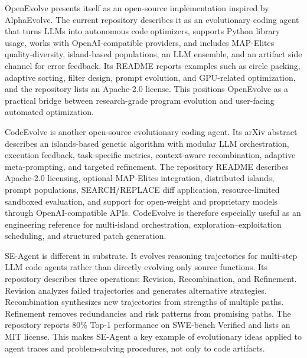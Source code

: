 OpenEvolve presents itself as an open-source implementation inspired by AlphaEvolve.  The current repository describes it as an evolutionary coding agent that turns LLMs into autonomous code optimizers, supports Python library usage, works with OpenAI-compatible providers, and includes MAP-Elites quality-diversity, island-based populations, an LLM ensemble, and an artifact side channel for error feedback.  Its README reports examples such as circle packing, adaptive sorting, filter design, prompt evolution, and GPU-related optimization, and the repository lists an Apache-2.0 license.  This positions OpenEvolve as a practical bridge between research-grade program evolution and user-facing automated optimization.

CodeEvolve is another open-source evolutionary coding agent.  Its arXiv abstract describes an islands-based genetic algorithm with modular LLM orchestration, execution feedback, task-specific metrics, context-aware recombination, adaptive meta-prompting, and targeted refinement.  The repository README describes Apache-2.0 licensing, optional MAP-Elites integration, distributed islands, prompt populations, SEARCH/REPLACE diff application, resource-limited sandboxed evaluation, and support for open-weight and proprietary models through OpenAI-compatible APIs.  CodeEvolve is therefore especially useful as an engineering reference for multi-island orchestration, exploration--exploitation scheduling, and structured patch generation.

SE-Agent is different in substrate.  It evolves reasoning trajectories for multi-step LLM code agents rather than directly evolving only source functions.  Its repository describes three operations: Revision, Recombination, and Refinement.  Revision analyzes failed trajectories and generates alternative strategies.  Recombination synthesizes new trajectories from strengths of multiple paths.  Refinement removes redundancies and risk patterns from promising paths.  The repository reports 80\% Top-1 performance on SWE-bench Verified and lists an MIT license.  This makes SE-Agent a key example of evolutionary ideas applied to agent traces and problem-solving procedures, not only to code artifacts.

